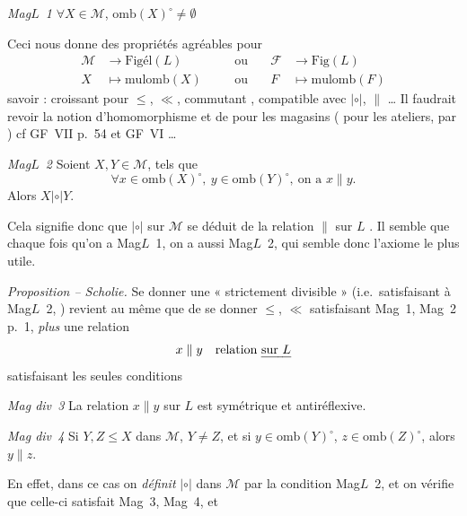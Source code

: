 \documentclass[11pt,a4paper]{article}
\begin{document}
\emph{Mag$L$~1} $\forall X \in \mathcal{M}$, $\mathrm{omb}(X)^{\circ} \neq \emptyset$

Ceci nous  donne des propriétés agréables pour
\[
\begin{aligned}
  \mathcal{M} &\longrightarrow \mathrm{Figél}(L) &\quad&\text{ou}\quad& \mathcal{F} &\longrightarrow \mathrm{Fig}(L) \\
  X &\longmapsto \mathrm{mulomb}(X) &&\text{ou}& F &\longmapsto \mathrm{mulomb}(F)
\end{aligned}
\]
savoir : croissant  pour $\leq$, $\ll$, commutant , compatible avec \add{$\leq$,} $|\circ|$, $\parallel$ … Il faudrait revoir la notion d'homomorphisme et de  pour les  magasins ( pour les ateliers, par ) cf GF~VII p.~54 et GF~VI …

\emph{Mag$L$~2} Soient $X, Y \in \mathcal{M}$,  tels que
\[
  \forall x \in \mathrm{omb}(X)^{\circ},\ y \in \mathrm{omb}(Y)^{\circ},\ \text{on a } x \parallel y .
\]
Alors $X |\circ| Y$.


Cela signifie donc que $|\circ|$ sur $\mathcal{M}$ se déduit de la \struck{\ill{}} relation $\parallel$ sur $L$ . Il semble que chaque fois qu'on a Mag$L$~1, on a aussi Mag$L$~2, qui semble donc l'axiome le plus utile.

\emph{Proposition -- Scholie.} Se donner   une  « strictement divisible » (i.e.\ satisfaisant à Mag$L$~2, \ill{}) revient au même que de se donner $\leq$, $\ll$ satisfaisant Mag~1, Mag~2 p.~1,  \emph{plus} une relation
\[
  x \parallel y \quad \text{relation \emph{sur $L$}}
\]
satisfaisant les seules conditions

\emph{Mag div~3} La relation $x \parallel y$ sur $L$ est symétrique et antiréflexive.

\emph{Mag div~4} Si $Y, Z \leq X$ dans $\mathcal{M}$, $Y \neq Z$, et si $y \in \mathrm{omb}(Y)^{\circ}$, $z \in \mathrm{omb}(Z)^{\circ}$, alors $y \parallel z$.

En effet, dans ce cas on \emph{définit} $|\circ|$ dans $\mathcal{M}$ par la condition  Mag$L$~2, et on vérifie  que  celle-ci satisfait Mag~3\add{*}, Mag~4, et 
\end{document}
